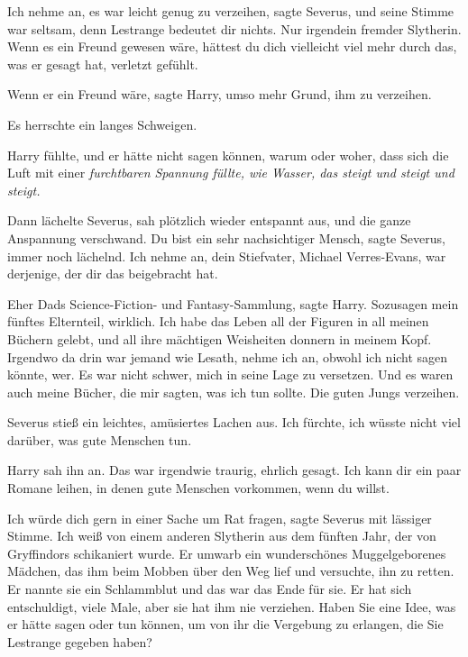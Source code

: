 \glqq Ich nehme an, es war leicht genug zu verzeihen\grqq{}, sagte Severus, und
seine Stimme war seltsam, \glqq denn Lestrange bedeutet dir nichts. Nur
irgendein fremder Slytherin. Wenn es ein Freund gewesen wäre, hättest du dich
vielleicht viel mehr durch das, was er gesagt hat, verletzt gefühlt.\grqq{}

\glqq Wenn er ein Freund wäre\grqq{}, sagte Harry, \glqq umso mehr Grund, ihm zu
verzeihen.\grqq{}

Es herrschte ein langes Schweigen.

Harry fühlte, und er hätte nicht sagen können, warum oder woher, dass sich die
Luft mit einer \emph{furchtbaren Spannung füllte, wie Wasser, das steigt und
steigt und steigt.}

Dann lächelte Severus, sah plötzlich wieder entspannt aus, und die ganze
Anspannung verschwand. \glqq Du bist ein sehr nachsichtiger Mensch\grqq{}, sagte
Severus, immer noch lächelnd. \glqq Ich nehme an, dein Stiefvater, Michael
Verres-Evans, war derjenige, der dir das beigebracht hat.\grqq{}

\glqq Eher Dads Science-Fiction- und Fantasy-Sammlung\grqq{}, sagte Harry. \glqq
Sozusagen mein fünftes Elternteil, wirklich. Ich habe das Leben all der Figuren
in all meinen Büchern gelebt, und all ihre mächtigen Weisheiten donnern in
meinem Kopf. Irgendwo da drin war jemand wie Lesath, nehme ich an, obwohl ich
nicht sagen könnte, wer. Es war nicht schwer, mich in seine Lage zu versetzen.
Und es waren auch meine Bücher, die mir sagten, was ich tun sollte. Die guten
Jungs verzeihen.\grqq{}

Severus stieß ein leichtes, amüsiertes Lachen aus. \glqq Ich fürchte, ich wüsste
nicht viel darüber, was gute Menschen tun.\grqq{}

Harry sah ihn an. Das war irgendwie traurig, ehrlich gesagt. \glqq Ich kann dir
ein paar Romane leihen, in denen gute Menschen vorkommen, wenn du willst.\grqq{}

\glqq Ich würde dich gern in einer Sache um Rat fragen\grqq{}, sagte Severus mit
lässiger Stimme. \glqq Ich weiß von einem anderen Slytherin aus dem fünften
Jahr, der von Gryffindors schikaniert wurde. Er umwarb ein wunderschönes
Muggelgeborenes Mädchen, das ihm beim Mobben über den Weg lief und versuchte,
ihn zu retten. Er nannte sie ein Schlammblut und das war das Ende für sie. Er
hat sich entschuldigt, viele Male, aber sie hat ihm nie verziehen. Haben Sie
eine Idee, was er hätte sagen oder tun können, um von ihr die Vergebung zu
erlangen, die Sie Lestrange gegeben haben?\grqq{}

